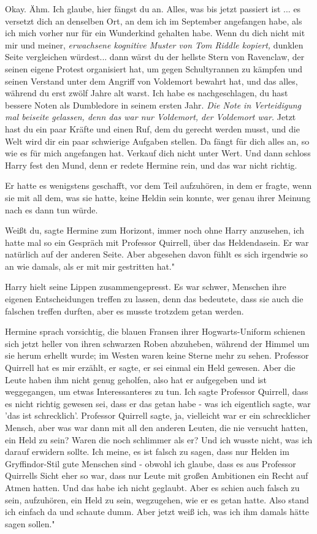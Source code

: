 \glqq Okay. Ähm. Ich glaube, hier fängst du an. Alles, was bis jetzt passiert
ist ... es versetzt dich an denselben Ort, an dem ich im September angefangen
habe, als ich mich vorher nur für ein Wunderkind gehalten habe. Wenn du dich
nicht mit mir und meiner\grqq{},\emph{ erwachsene kognitive Muster von Tom
Riddle kopiert,} \glqq dunklen Seite vergleichen würdest... dann wärst du der
hellste Stern von Ravenclaw, der seinen eigene Protest organisiert hat, um gegen
Schultyrannen zu kämpfen und seinen Verstand unter dem Angriff von Voldemort
bewahrt hat, und das alles, während du erst zwölf Jahre alt warst. Ich habe es
nachgeschlagen, du hast bessere Noten als Dumbledore in seinem ersten
Jahr.\grqq{} \emph{Die Note in Verteidigung mal beiseite gelassen, denn das war
nur Voldemort, der Voldemort war.} \glqq Jetzt hast du ein paar Kräfte und einen
Ruf, dem du gerecht werden musst, und die Welt wird dir ein paar schwierige
Aufgaben stellen. Da fängt für dich alles an, so wie es für mich angefangen hat.
Verkauf dich nicht unter Wert.\grqq{} Und dann schloss Harry fest den Mund, denn
er redete Hermine rein, und das war nicht richtig.

Er hatte es wenigstens geschafft, vor dem Teil aufzuhören, in dem er fragte,
wenn sie mit all dem, was sie hatte, keine Heldin sein konnte, wer genau ihrer
Meinung nach es dann tun würde.

\glqq Weißt du\grqq{}, sagte Hermine zum Horizont, immer noch ohne Harry
anzusehen, \glqq ich hatte mal so ein Gespräch mit Professor Quirrell, über das
Heldendasein. Er war natürlich auf der anderen Seite. Aber abgesehen davon fühlt
es sich irgendwie so an wie damals, als er mit mir gestritten hat."

Harry hielt seine Lippen zusammengepresst. Es war schwer, Menschen ihre eigenen
Entscheidungen treffen zu lassen, denn das bedeutete, dass sie auch die falschen
treffen durften, aber es musste trotzdem getan werden.

Hermine sprach vorsichtig, die blauen Fransen ihrer Hogwarts-Uniform schienen
sich jetzt heller von ihren schwarzen Roben abzuheben, während der Himmel um sie
herum erhellt wurde; im Westen waren keine Sterne mehr zu sehen. \glqq Professor
Quirrell hat es mir erzählt, er sagte, er sei einmal ein Held gewesen. Aber die
Leute haben ihm nicht genug geholfen, also hat er aufgegeben und ist
weggegangen, um etwas Interessanteres zu tun. Ich sagte Professor Quirrell, dass
es nicht richtig gewesen sei, dass er das getan habe - was ich eigentlich sagte,
war 'das ist schrecklich'. Professor Quirrell sagte, ja, vielleicht war er ein
schrecklicher Mensch, aber was war dann mit all den anderen Leuten, die nie
versucht hatten, ein Held zu sein? Waren die noch schlimmer als er? Und ich
wusste nicht, was ich darauf erwidern sollte. Ich meine, es ist falsch zu sagen,
dass nur Helden im Gryffindor-Stil gute Menschen sind - obwohl ich glaube, dass
es aus Professor Quirrells Sicht eher so war, dass nur Leute mit großen
Ambitionen ein Recht auf Atmen hatten. Und das habe ich nicht geglaubt. Aber es
schien auch falsch zu sein, aufzuhören, ein Held zu sein, wegzugehen, wie er es
getan hatte. Also stand ich einfach da und schaute dumm. Aber jetzt weiß ich,
was ich ihm damals hätte sagen sollen."

